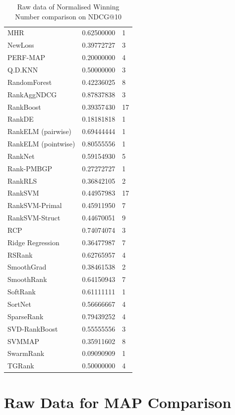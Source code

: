 \documentclass{sig-alternate-2013}
\begin{document}
\begin{table}
\begin{tabular}{l|l|l}
MHR & 0.62500000 & 1 \\ 
NewLoss & 0.39772727 & 3 \\ 
PERF-MAP & 0.20000000 & 4 \\ 
Q.D.KNN & 0.50000000 & 3 \\ 
RandomForest & 0.42236025 & 8 \\ 
RankAggNDCG & 0.87837838 & 3 \\ 
RankBoost & 0.39357430 & 17 \\ 
RankDE & 0.18181818 & 1 \\ 
RankELM (pairwise) & 0.69444444 & 1 \\ 
RankELM (pointwise) & 0.80555556 & 1 \\ 
RankNet & 0.59154930 & 5 \\ 
Rank-PMBGP & 0.27272727 & 1 \\ 
RankRLS & 0.36842105 & 2 \\ 
RankSVM & 0.44957983 & 17 \\ 
RankSVM-Primal & 0.45911950 & 7 \\ 
RankSVM-Struct & 0.44670051 & 9 \\ 
RCP & 0.74074074 & 3 \\ 
Ridge Regression & 0.36477987 & 7 \\ 
RSRank & 0.62765957 & 4 \\ 
SmoothGrad & 0.38461538 & 2 \\ 
SmoothRank & 0.64150943 & 7 \\ 
SoftRank & 0.61111111 & 1 \\ 
SortNet & 0.56666667 & 4 \\ 
SparseRank & 0.79439252 & 4 \\ 
SVD-RankBoost & 0.55555556 & 3 \\ 
SVMMAP & 0.35911602 & 8 \\ 
SwarmRank & 0.09090909 & 1 \\ 
TGRank & 0.50000000 & 4 \\
\end{tabular}
\caption{Raw data of Normalised Winning Number comparison on NDCG@10}
\label{tab:raw_data_norm_winnum_NDCG10}
\end{table}

\section{Raw Data for MAP Comparison}
\label{app:norm_winnum_map}
\end{document}
